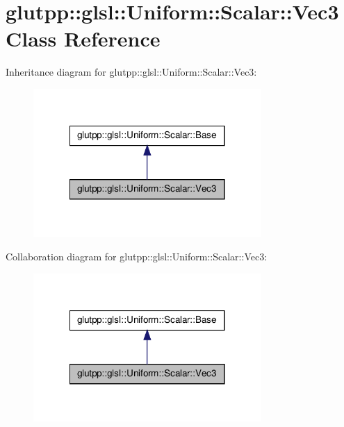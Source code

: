 \hypertarget{classglutpp_1_1glsl_1_1Uniform_1_1Scalar_1_1Vec3}{\section{glutpp\-:\-:glsl\-:\-:\-Uniform\-:\-:\-Scalar\-:\-:\-Vec3 \-Class \-Reference}
\label{classglutpp_1_1glsl_1_1Uniform_1_1Scalar_1_1Vec3}
}


\-Inheritance diagram for glutpp\-:\-:glsl\-:\-:\-Uniform\-:\-:\-Scalar\-:\-:\-Vec3\-:\nopagebreak
\begin{figure}[H]
\begin{center}
\leavevmode
\includegraphics[width=246pt]{classglutpp_1_1glsl_1_1Uniform_1_1Scalar_1_1Vec3__inherit__graph}
\end{center}
\end{figure}


\-Collaboration diagram for glutpp\-:\-:glsl\-:\-:\-Uniform\-:\-:\-Scalar\-:\-:\-Vec3\-:\nopagebreak
\begin{figure}[H]
\begin{center}
\leavevmode
\includegraphics[width=246pt]{classglutpp_1_1glsl_1_1Uniform_1_1Scalar_1_1Vec3__coll__graph}
\end{center}
\end{figure}
